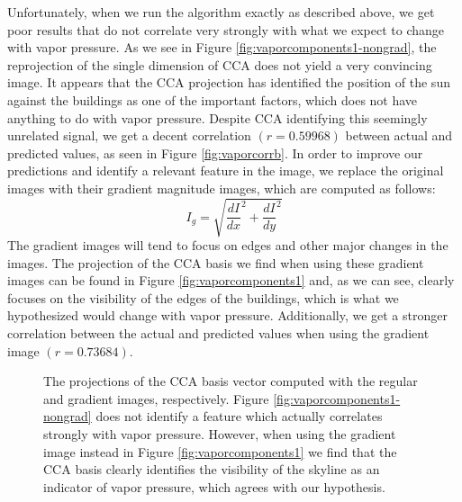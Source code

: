 Unfortunately, when we run the algorithm exactly as described above, we get poor results that do not correlate very strongly with what we expect to change with vapor pressure. As we see in Figure \ref{fig:vaporcomponents1-nongrad}, the reprojection of the single dimension of CCA does not yield a very convincing image. It appears that the CCA projection has identified the position of the sun against the buildings as one of the important factors, which does not have anything to do with vapor pressure. Despite CCA identifying this seemingly unrelated signal, we get a decent correlation $(r=0.59968)$ between actual and predicted values, as seen in Figure \ref{fig:vaporcorrb}. In order to improve our predictions and identify a relevant feature in the image, we replace the original images with their gradient magnitude images, which are computed as follows:
\begin{equation}\label{eq:grad}I_g=\sqrt{\frac{dI}{dx}^2 + \frac{dI}{dy}^2}\end{equation}
The gradient images will tend to focus on edges and other major changes in the images. The projection of the CCA basis we find when using these gradient images can be found in Figure \ref{fig:vaporcomponents1} and, as we can see, clearly focuses on the visibility of the edges of the buildings, which is what we hypothesized would change with vapor pressure. Additionally, we get a stronger correlation between the actual and predicted values when using the gradient image $(r=0.73684)$.
\begin{figure}
	\centering
	\caption{The projections of the CCA basis vector computed with the regular and gradient images, respectively. Figure \ref{fig:vaporcomponents1-nongrad} does not identify a feature which actually correlates strongly with vapor pressure. However, when using the gradient image instead in Figure \ref{fig:vaporcomponents1} we find that the CCA basis clearly identifies the visibility of the skyline as an indicator of vapor pressure, which agrees with our hypothesis.}
	\label{fig:vaporcomponents}
\end{figure}
